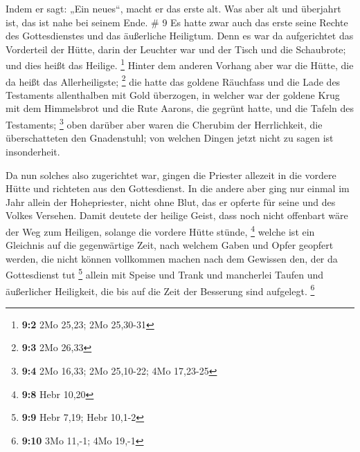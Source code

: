  Indem er sagt: „Ein neues``, macht er das erste alt. Was
aber alt und überjahrt ist, das ist nahe bei seinem Ende. \# 9
 Es hatte zwar auch das erste seine Rechte des
Gottesdienstes und das äußerliche Heiligtum.  Denn es war
da aufgerichtet das Vorderteil der Hütte, darin der Leuchter war und der
Tisch und die Schaubrote; und dies heißt das Heilige. \footnote{\textbf{9:2}
  2Mo 25,23; 2Mo 25,30-31}  Hinter dem anderen Vorhang
aber war die Hütte, die da heißt das Allerheiligste; \footnote{\textbf{9:3}
  2Mo 26,33}  die hatte das goldene Räuchfass und die Lade
des Testaments allenthalben mit Gold überzogen, in welcher war der
goldene Krug mit dem Himmelsbrot und die Rute Aarons, die gegrünt hatte,
und die Tafeln des Testaments; \footnote{\textbf{9:4} 2Mo 16,33; 2Mo
  25,10-22; 4Mo 17,23-25}  oben darüber aber waren die
Cherubim der Herrlichkeit, die überschatteten den Gnadenstuhl; von
welchen Dingen jetzt nicht zu sagen ist insonderheit.

 Da nun solches also zugerichtet war, gingen die Priester
allezeit in die vordere Hütte und richteten aus den Gottesdienst.
 In die andere aber ging nur einmal im Jahr allein der
Hohepriester, nicht ohne Blut, das er opferte für seine und des Volkes
Versehen.  Damit deutete der heilige Geist, dass noch
nicht offenbart wäre der Weg zum Heiligen, solange die vordere Hütte
stünde, \footnote{\textbf{9:8} Hebr 10,20}  welche ist ein
Gleichnis auf die gegenwärtige Zeit, nach welchem Gaben und Opfer
geopfert werden, die nicht können vollkommen machen nach dem Gewissen
den, der da Gottesdienst tut \footnote{\textbf{9:9} Hebr 7,19; Hebr
  10,1-2}  allein mit Speise und Trank und mancherlei
Taufen und äußerlicher Heiligkeit, die bis auf die Zeit der Besserung
sind aufgelegt. \footnote{\textbf{9:10} 3Mo 11,-1; 4Mo 19,-1}

